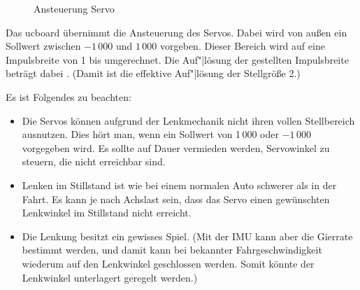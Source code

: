 \begin{figure}[htb]%
	\centering
	
	\caption{Ansteuerung Servo}%
	\label{fig:Steering:Servo}%
\end{figure}


Das ucboard übernimmt die Ansteuerung des Servos. Dabei wird von außen ein Sollwert zwischen $-1\,000$ und $1\,000$ vorgeben. Dieser Bereich wird auf eine Impulsbreite von 1 bis  umgerechnet. Die Auf"|lösung der gestellten Impulsbreite beträgt dabei . (Damit ist die effektive Auf"|lösung der Stellgröße 2.)

Es ist Folgendes zu beachten:
\begin{itemize}
	\item Die Servos können aufgrund der Lenkmechanik nicht ihren vollen Stellbereich ausnutzen. Dies hört man, wenn ein Sollwert von 1\,000 oder $-1\,000$ vorgegeben wird. Es sollte auf Dauer vermieden werden, Servowinkel zu steuern, die nicht erreichbar sind.
	\item Lenken im Stillstand ist wie bei einem normalen Auto schwerer als in der Fahrt. Es kann je nach Achslast sein, dass das Servo einen gewünschten Lenkwinkel im Stillstand nicht erreicht. 
	\item Die Lenkung besitzt ein gewisses Spiel. (Mit der IMU kann aber die Gierrate bestimmt werden, und damit kann bei bekannter Fahrgeschwindigkeit wiederum auf den Lenkwinkel geschlossen werden. Somit könnte der Lenkwinkel unterlagert geregelt werden.)
\end{itemize}




